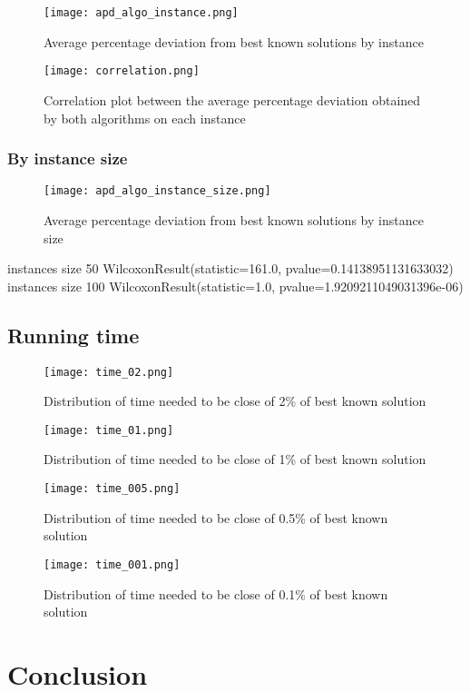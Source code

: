\documentclass[a4paper,10pt]{article}
\begin{document}
\cite{main}

\begin{figure}[H]
	\centering
	\caption{Average percentage deviation from best known solutions by instance}
	\texttt{[image: apd\_algo\_instance.png]}
\end{figure}


\begin{figure}[H]
	\centering
	\caption{Correlation plot between the average percentage deviation obtained by both algorithms on each instance}
	\texttt{[image: correlation.png]}
\end{figure}


\subsubsection{By instance size}

\begin{figure}[H]
	\centering
	\caption{Average percentage deviation from best known solutions by instance size}
	\texttt{[image: apd\_algo\_instance\_size.png]}
\end{figure}

instances size 50
WilcoxonResult(statistic=161.0, pvalue=0.14138951131633032)
instances size 100
WilcoxonResult(statistic=1.0, pvalue=1.9209211049031396e-06)

\subsection{Running time}

\begin{figure}[H]
	\centering
	\caption{Distribution of time needed to be close of 2\% of best known solution}
	\texttt{[image: time\_02.png]}
\end{figure}

\begin{figure}[H]
	\centering
	\caption{Distribution of time needed to be close of 1\% of best known solution}
	\texttt{[image: time\_01.png]}
\end{figure}

\begin{figure}[H]
	\centering
	\caption{Distribution of time needed to be close of 0.5\% of best known solution}
	\texttt{[image: time\_005.png]}
\end{figure}

\begin{figure}[H]
	\centering
	\caption{Distribution of time needed to be close of 0.1\% of best known solution}
	\texttt{[image: time\_001.png]}
\end{figure}


\section{Conclusion}




\end{document}
